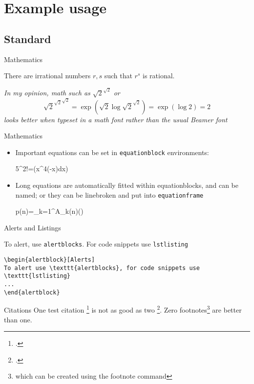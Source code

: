\documentclass{beamer}
\begin{document}
\section{Example usage}
\subsection{Standard}
\begin{frame}{Mathematics}
\begin{theorem}
There are irrational numbers $r,s$ such that $r^s$ is rational.
\end{theorem}
\textit{In my opinion, math such as $\sqrt{2}^{\sqrt{2}}$ or 
 $$
 {\sqrt{2}^{\sqrt{2}}}^{\sqrt{2}}=\exp(\sqrt{2}\log\sqrt{2}^{\sqrt{2}})=\exp(\log{2})=2
 $$ looks better when typeset in a math font rather than the usual Beamer font}\hfill\qedsymbol

\end{frame}
\begin{frame}{Mathematics}
\begin{itemize}
	\item Important equations can be set in \texttt{equationblock} environments:
	\begin{equationblock}
		5^2!=\exp\left(\int x^4\exp(-x)\;dx\right)
	\end{equationblock}	
	\item Long equations are automatically fitted within equationblocks, and can be named; or they can be linebroken and put into \texttt{equationframe}
	\begin{equationblock}
		p(n)=\sum_{k=1}^{\infty}A_{k}(n)\left(\sinh{}\right)
	\end{equationblock}
\end{itemize}
\end{frame}
\begin{frame}[fragile]{Alerts and Listings}
\begin{alertblock}
To alert, use \texttt{alertblocks}. For code snippets use \texttt{lstlisting}
\begin{lstlisting}
\begin{alertblock}[Alerts]
To alert use \texttt{alertblocks}, for code snippets use \texttt{lstlisting}
...
\end{alertblock}
\end{lstlisting}
\end{alertblock}
\end{frame}
\begin{frame}{Citations}
One test citation \footcite{AdamsFournier2003} is not as good as two \footcite{AlexanderianPetraStadlerEtAl2016}. 
Zero footnotes\footnote{which can be created using the footnote command} are better than one.
\end{frame}
\end{document}
